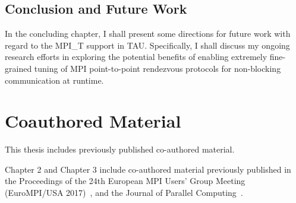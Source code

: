 \subsection {Conclusion and Future Work}
In the concluding chapter, I shall present some directions for future work with regard to the MPI\_T support in TAU. Specifically, I shall discuss my ongoing research efforts in exploring the potential benefits of enabling extremely fine-grained tuning of MPI point-to-point rendezvous protocols for non-blocking communication at runtime.

\section {Coauthored Material}
This thesis includes previously published co-authored material. 
\par Chapter 2 and Chapter 3 include co-authored material previously published in the Proceedings of the 24th European MPI Users' Group Meeting (EuroMPI/USA 2017)~\cite{EuroMPI}, and the Journal of Parallel Computing~\cite{ParCo}.
